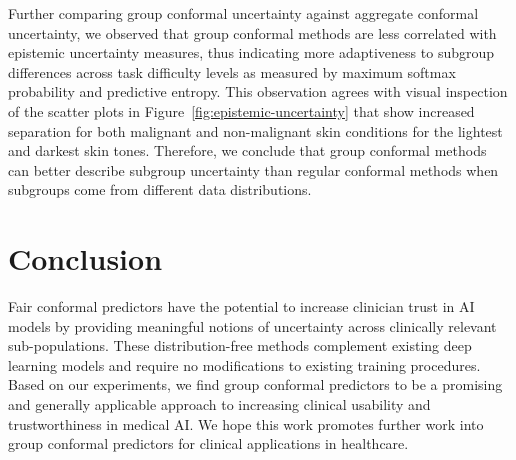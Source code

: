 \documentclass[letterpaper]{article} %
\begin{document}
Further comparing group conformal uncertainty against aggregate conformal uncertainty, we observed that group conformal methods are less correlated with epistemic uncertainty measures, thus indicating more adaptiveness to subgroup differences across task difficulty levels as measured by maximum softmax probability and predictive entropy.
This observation agrees with visual inspection of the scatter plots in Figure~\ref{fig:epistemic-uncertainty} that show increased separation for both malignant and non-malignant skin conditions for the lightest and darkest skin tones.
Therefore, we conclude that group conformal methods can better describe subgroup uncertainty than regular conformal methods when subgroups come from different data distributions.

\section{Conclusion}
Fair conformal predictors have the potential to increase clinician trust in AI models by providing meaningful notions of uncertainty across clinically relevant sub-populations.
These distribution-free methods complement existing deep learning models and require no modifications to existing training procedures.
Based on our experiments, we find group conformal predictors to be a promising and generally applicable approach to increasing clinical usability and trustworthiness in medical AI.
We hope this work promotes further work into group conformal predictors for clinical applications in healthcare.
\end{document}
